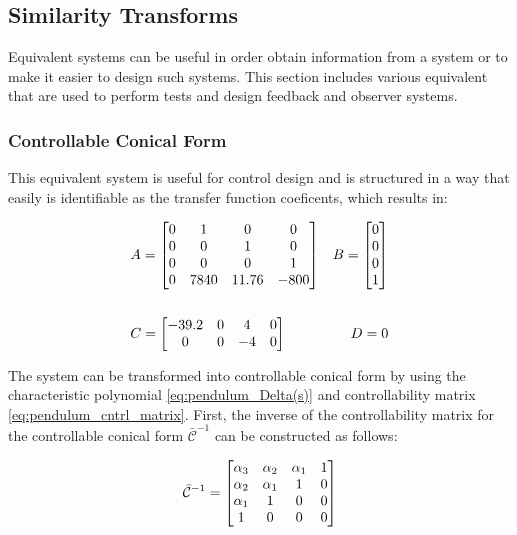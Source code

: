 \documentclass[]{article}
\newcommand{\ctrbl}{\mathcal{C}}
\begin{document}
	\newpage
	\subsection{Similarity Transforms}
		Equivalent systems can be useful in order obtain information from a system or to make it easier to design such systems. This section includes various equivalent that are used to perform tests and design feedback and observer systems.
		
		\subsubsection{Controllable Conical Form}
			This equivalent system is useful for control design and is structured in a way that easily is identifiable as the transfer function coeficents, which results in:
			
			\begin{equation}
				\begin{aligned}
					&A = \mqty[	0 & 1 & 0 & 0 \\
								0 & 0 & 1 & 0 \\
								0 & 0 & 0 & 1 \\
								0 & 7840 & 11.76 & -800]
					&B = \mqty[	0\\ 0\\ 0\\ 1] \\ && \\
					&C = \mqty[	-39.2	&0	&4	&0\\
								0 		&0	&-4	&0]
					&D = 0
				\end{aligned}
				\label{eq:pendulum_ctbl_conical_form}
			\end{equation}
			
			
			The system can be transformed into controllable conical form by using the characteristic polynomial \eqref{eq:pendulum_Delta(s)} and controllability matrix \eqref{eq:pendulum_cntrl_matrix}. First, the inverse of the controllability matrix for the controllable conical form $\bar{\ctrbl}^{-1}$ can be constructed as follows:
			
			\begin{equation}
				\bar{\ctrbl}^{-1} 	= \mqty[\alpha_3 & \alpha_2 & \alpha_1 & 1 \\
				\alpha_2 & \alpha_1 & 1 & 0 \\
				\alpha_1 & 1 & 0 & 0 \\
				1 & 0 & 0 & 0]
			\end{equation}
			
\end{document}
